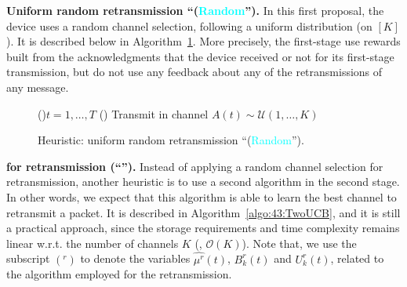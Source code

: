 \textbf{Uniform random retransmission ``(\textcolor{cyan}{Random}'').}\label{sub:43:UCBthenRandom}
%
In this first proposal, the device uses a random channel selection, following a uniform distribution (on $[K]$).
It is described below in Algorithm~\ref{algo:43:UCBthenRandom}.
More precisely, the first-stage \UCB{} use rewards built from the acknowledgments that the device received or not for its first-stage transmission, but do not use any feedback about any of the retransmissions of any message.

\begin{figure}[h!]
	\centering
    \begin{framed}
	\begin{algorithm}[H]
	\For(){$t = 1, \dots, T$}{
			\Else(){
				Transmit in channel $A(t) \sim \mathcal{U}(1,\ldots,K)$\;
			}
		}
		\caption[Heuristic: uniform random retransmission.]{Heuristic: uniform random retransmission ``(\textcolor{cyan}{Random}'').}    %
		\label{algo:43:UCBthenRandom}
	\end{algorithm}
	\end{framed}
\end{figure}


\textbf{\UCB{} for retransmission (``\textcolor{purple}{\UCB{}}'').}\label{sub:43:TwoUCB}
%
Instead of applying a random channel selection for retransmission,
another heuristic is to use a second \UCB{} algorithm in the second stage.
In other words, we expect that this algorithm is able to learn the best channel to retransmit a packet.
It is described in Algorithm~\ref{algo:43:TwoUCB}, and it is still a practical approach, since the storage requirements and time complexity remains linear w.r.t. the number of channels $K$ (\ie, $\mathcal{O}(K)$).
%
Note that, we use the subscript $({}^r)$ to denote the variables
$\widehat{\mu^r}(t)$, $B^r_k(t)$ and $U^r_k(t)$,
related to the \UCB{} algorithm employed for the retransmission.

